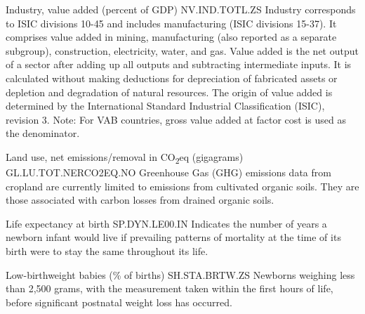 \begin{MetadataCollection}
\begin{metadata}{ Industry, value added (percent of GDP) }{ NV.IND.TOTL.ZS }
Industry corresponds to ISIC divisions 10-45 and includes manufacturing (ISIC divisions 15-37). It comprises value added in mining, manufacturing (also reported as a separate subgroup), construction, electricity, water, and gas. Value added is the net output of a sector after adding up all outputs and subtracting intermediate inputs. It is calculated without making deductions for depreciation of fabricated assets or depletion and degradation of natural resources. The origin of value added is determined by the International Standard Industrial Classification (ISIC), revision 3. Note: For VAB countries, gross value added at factor cost is used as the denominator. 
\end{metadata}

\begin{metadata}{ Land use, net emissions/removal in CO\textsubscript{2}eq (gigagrams) }{ GL.LU.TOT.NERCO2EQ.NO }
Greenhouse Gas (GHG) emissions data from cropland are currently limited to emissions from cultivated organic soils. They are those associated with carbon losses from drained organic soils.  
\end{metadata}

\begin{metadata}{ Life expectancy at birth }{ SP.DYN.LE00.IN }
Indicates the number of years a newborn infant would live if prevailing patterns of mortality at the time of its birth were to stay the same throughout its life. 
\end{metadata}

\begin{metadata}{ Low-birthweight babies (\% of births) }{ SH.STA.BRTW.ZS }
Newborns weighing less than 2,500 grams, with the measurement taken within the first hours of life, before significant postnatal weight loss has occurred. 
\end{metadata}


\end{MetadataCollection}
